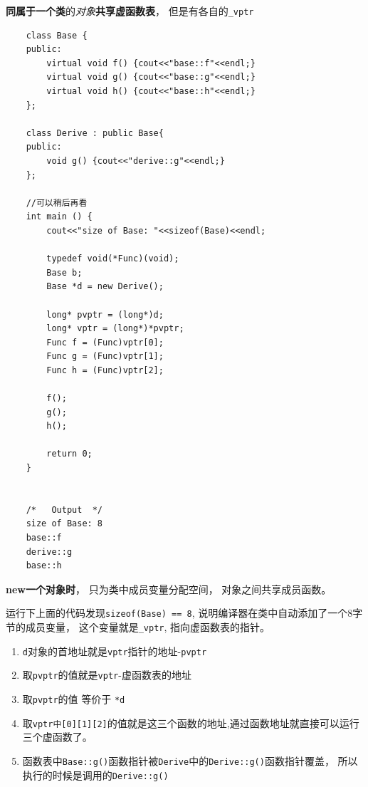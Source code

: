 \documentclass[UTF8,a4paper,12pt]{ctexbook} %
\begin{document}
	        
	        \textbf{同属于一个类}的\textit{对象}\textbf{共享虚函数表}， 但是有各自的\verb|_vptr|
        	\begin{lstlisting}
	class Base {
	public:
		virtual void f() {cout<<"base::f"<<endl;}
		virtual void g() {cout<<"base::g"<<endl;}
		virtual void h() {cout<<"base::h"<<endl;}
	};
	
	class Derive : public Base{
	public:
		void g() {cout<<"derive::g"<<endl;}
	};
	
	//可以稍后再看
	int main () {
		cout<<"size of Base: "<<sizeof(Base)<<endl;
		
		typedef void(*Func)(void);
		Base b;
		Base *d = new Derive();
		
		long* pvptr = (long*)d;
		long* vptr = (long*)*pvptr;
		Func f = (Func)vptr[0];
		Func g = (Func)vptr[1];
		Func h = (Func)vptr[2];
		
		f();
		g();
		h();
		
		return 0;
	}
	
	
	/*   Output  */
	size of Base: 8
	base::f
	derive::g
	base::h
	        \end{lstlisting}
	        
	       \textbf{new一个对象时}， 只为类中成员变量分配空间， 对象之间共享成员函数。
	        
	       运行下上面的代码发现\verb|sizeof(Base) == 8|, 说明编译器在类中自动添加了一个8字节的成员变量， 这个变量就是\verb|_vptr|, 指向虚函数表的指针。
	       
	       \begin{enumerate}
		       	\item \verb|d|对象的首地址就是\verb|vptr|指针的地址-\verb|pvptr|
		       	\item 取\verb|pvptr|的值就是\verb|vptr|-虚函数表的地址
		       	\item 取\verb|pvptr|的值 等价于 \verb|*d|
		       	\item 取\verb|vptr中[0][1][2]|的值就是这三个函数的地址,通过函数地址就直接可以运行三个虚函数了。
		       	\item 函数表中\verb|Base::g()|函数指针被\verb|Derive|中的\verb|Derive::g()|函数指针覆盖， 所以执行的时候是调用的\verb|Derive::g()|
	       \end{enumerate}
	       
\end{document}
